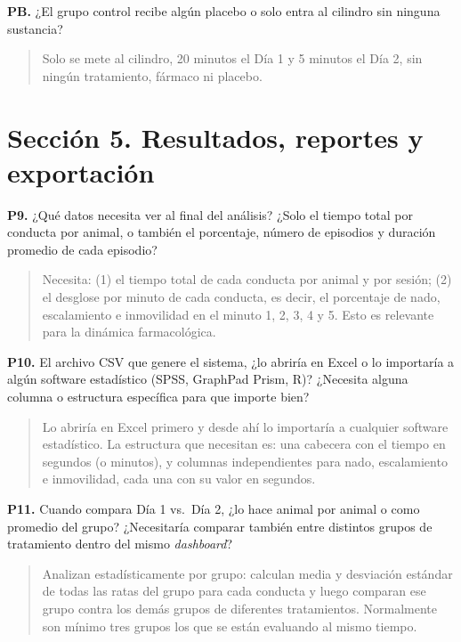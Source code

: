 \textbf{PB.} ¿El grupo control recibe algún placebo o solo entra al cilindro sin
ninguna sustancia?

\begin{quote}
Solo se mete al cilindro, 20 minutos el Día 1 y 5 minutos el Día 2, sin ningún
tratamiento, fármaco ni placebo.
\end{quote}

\section*{Sección 5. Resultados, reportes y exportación}

\textbf{P9.} ¿Qué datos necesita ver al final del análisis? ¿Solo el tiempo total por
conducta por animal, o también el porcentaje, número de episodios y duración promedio
de cada episodio?

\begin{quote}
Necesita: (1) el tiempo total de cada conducta por animal y por sesión; (2) el
desglose por minuto de cada conducta, es decir, el porcentaje de nado, escalamiento e
inmovilidad en el minuto 1, 2, 3, 4 y 5. Esto es relevante para la dinámica
farmacológica.
\end{quote}

\textbf{P10.} El archivo CSV que genere el sistema, ¿lo abriría en Excel o lo
importaría a algún software estadístico (SPSS, GraphPad Prism, R)? ¿Necesita alguna
columna o estructura específica para que importe bien?

\begin{quote}
Lo abriría en Excel primero y desde ahí lo importaría a cualquier software
estadístico. La estructura que necesitan es: una cabecera con el tiempo en segundos
(o minutos), y columnas independientes para nado, escalamiento e inmovilidad, cada
una con su valor en segundos.
\end{quote}

\textbf{P11.} Cuando compara Día 1 vs.\ Día 2, ¿lo hace animal por animal o como
promedio del grupo? ¿Necesitaría comparar también entre distintos grupos de
tratamiento dentro del mismo \textit{dashboard}?

\begin{quote}
Analizan estadísticamente por grupo: calculan media y desviación estándar de todas las
ratas del grupo para cada conducta y luego comparan ese grupo contra los demás grupos
de diferentes tratamientos. Normalmente son mínimo tres grupos los que se están
evaluando al mismo tiempo.
\end{quote}

